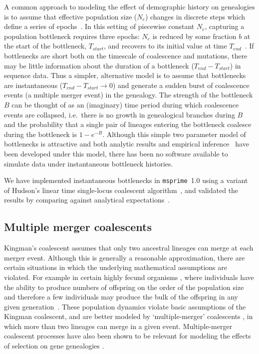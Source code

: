 \documentclass[9pt,twocolumn,twoside,lineno]{gsajnl}
\newcommand{\msprime}[0]{\texttt{msprime}}
\begin{document}
A common approach to modeling the effect of demographic history on genealogies
is to assume that effective population size ($N_e$) changes in discrete steps
which define a series of epochs~\citep{griffiths1994sampling, marth2004allele,
keightley2007joint,li2011inference}. In this setting of piecewise constant
$N_e$, capturing a population bottleneck requires three epochs: $N_e$ is
reduced by some fraction $b$ at the start of the bottleneck, $T_{start}$, and
recovers to its initial value at time $T_{end}$~\citep{marth2004allele}. If
bottlenecks are short both on the timescale of coalescence and mutations,
there may be little information about the duration of a bottleneck
($T_{end}-T_{start}$) in sequence data. Thus a simpler, alternative model is to
assume that bottlenecks are instantaneous ($T_{end}-T_{start} \rightarrow 0$)
and generate a sudden burst of coalescence events (a multiple merger event) in
the genealogy. The strength of the bottleneck $B$ can be thought of as an
(imaginary) time period during which coalescence events are collapsed,
i.e.\ there is no growth in genealogical branches during $B$ and the probability that a
single pair of lineages entering the bottleneck coalesce during the bottleneck
is $1-e^{-B}$. Although this simple two parameter model of bottlenecks is
attractive and both analytic results and empirical
inference~\citep{griffiths1994sampling, birkner2009modified,galtier2000detecting,
bunnefeld2015inferring} have been developed under this model, there has
been no software available to simulate data under instantaneous
bottleneck histories.

We have implemented instantaneous bottlenecks in \msprime~1.0
using a variant of Hudson's linear time single-locus coalescent
algorithm~\citep{hudson1990gene}, and
validated the results by comparing
against analytical expectations~\citep{bunnefeld2015inferring}.

\subsection*{Multiple merger coalescents}

Kingman's coalescent assumes that only two ancestral lineages can merge at
each merger event. Although this is generally a reasonable approximation, there
are certain situations in which the underlying mathematical assumptions are
violated. For example in certain highly fecund organisms
\citep{hedgecock_94,B94,HP11,A04,irwin16,vendrami2021sweepstake},
where individuals have the ability
to produce numbers of offspring on the order of the population size and
therefore a few individuals may produce the bulk of the offspring in any given
generation~\citep{hedgecock_94}. These population dynamics violate basic
assumptions of the Kingman coalescent, and are better modeled by
`multiple-merger' coalescents \citep{DK99,P99,S99,S00,MS01}, in which more than
two lineages can merge in a given event. Multiple-merger coalescent processes
have also been shown to be relevant for modeling the effects of selection on
gene genealogies
\citep{Gillespie909,DS04,desai2013genetic,neher2013genealogies,schweinsberg2017rigorous}.
\end{document}
